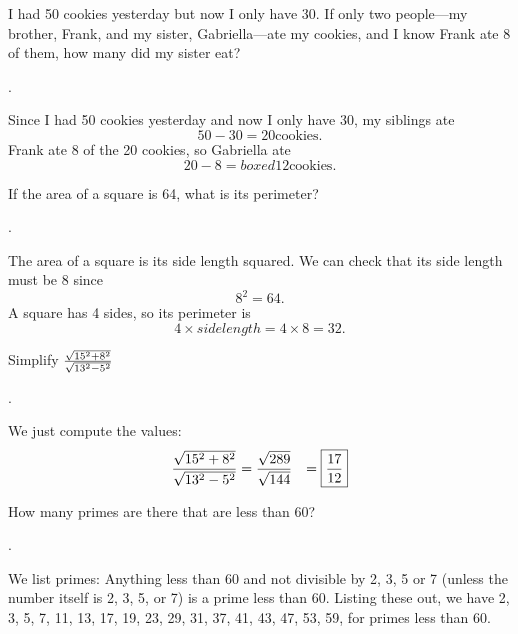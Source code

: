 \documentclass[11pt]{article}
\DeclareRobustCommand{\frac}[3][0pt]{%
  {\begingroup\hspace{#1}#2\hspace{#1}\endgroup\over\hspace{#1}#3\hspace{#1}}}
\begin{document}
\begin{problem}
I had 50 cookies yesterday but now I only have 30. If only two people---my brother, Frank, and my sister, Gabriella---ate my cookies, and I know Frank ate 8 of them, how many did my sister eat?
\end{problem}
\begin{answer}
.
\end{answer}
\begin{solution}
Since I had 50 cookies yesterday and now I only have 30, my siblings ate
$$50-30 = 20 \text{cookies}.$$
Frank ate 8 of the 20 cookies, so Gabriella ate
$$20-8=boxed{12} \text{cookies}.$$
\end{solution}

\begin{problem}
If the area of a square is 64, what is its perimeter?
\end{problem}
\begin{answer}
.
\end{answer}
\begin{solution}
The area of a square is its side length squared. We can check that its side length must be 8 since
$$8^2 = 64.$$
A square has 4 sides, so its perimeter is
$$4 \times {side length} = 4 \times 8 = \boxed{32}.$$
\end{solution}


\begin{problem}
Simplify $\frac{\sqrt{15^2+8^2}}{\sqrt{13^2-5^2}}$
\end{problem}
\begin{answer}
 \boxed{\frac{17}{12}}.
\end{answer}
\begin{solution}
We just compute the values:
\begin{align*}
\frac{\sqrt{15^2+8^2}}{\sqrt{13^2-5^2}} &= \frac{\sqrt{289}}{\sqrt{144}}
                    	&= \boxed{\frac{17}{12}}
\end{align*}
\end{solution}


\begin{problem}How many primes are there that are less than 60?
\end{problem}

.
\begin{solution}
We list primes: Anything less than 60 and not divisible by 2, 3, 5 or 7 (unless the number itself is 2, 3, 5, or 7) is a prime less than 60. Listing these out, we have 2, 3, 5, 7, 11, 13, 17, 19, 23, 29, 31, 37, 41, 43, 47, 53, 59, for  primes less than 60.
\end{solution}
\end{document}
